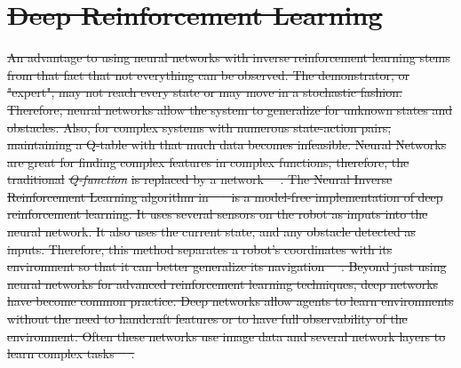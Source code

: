 \documentclass[12pt,american]{report}
\providecommand{\DIFdeltex}[1]{{\protect\color{red}\sout{#1}}}                      %
\providecommand{\DIFdelbegin}{} %
\providecommand{\DIFdel}[1]{\texorpdfstring{\DIFdeltex{#1}}{}} %
\newcommand{\DIFscaledelfig}{0.5}
\newlength{\DIFdelgraphicswidth} %
\newlength{\DIFdelgraphicsheight} %
\newcommand{\DIFdelincludegraphics}[2][]{%
\sbox{\DIFdelgraphicsbox}{\DIFOincludegraphics[#1]{#2}}%
\settoboxwidth{\DIFdelgraphicswidth}{\DIFdelgraphicsbox} %
\settoboxtotalheight{\DIFdelgraphicsheight}{\DIFdelgraphicsbox} %
\scalebox{\DIFscaledelfig}{%
\parbox[b]{\DIFdelgraphicswidth}{\usebox{\DIFdelgraphicsbox}\\[-\baselineskip] \rule{\DIFdelgraphicswidth}{0em}}\llap{\resizebox{\DIFdelgraphicswidth}{\DIFdelgraphicsheight}{%
\setlength{\unitlength}{\DIFdelgraphicswidth}%
\begin{picture}(1,1)%
\thicklines\linethickness{2pt} %
{\color[rgb]{1,0,0}\put(0,0){\framebox(1,1){}}}%
{\color[rgb]{1,0,0}\put(0,0){\line( 1,1){1}}}%
{\color[rgb]{1,0,0}\put(0,1){\line(1,-1){1}}}%
\end{picture}%
}\hspace*{3pt}}} %
} %
\DeclareRobustCommand{\DIFdelbegin}{\DIFOdelbegin \let\includegraphics\DIFdelincludegraphics} %
\begin{document}
\DIFdelbegin \section{\DIFdel{Deep Reinforcement Learning}}
\addtocounter{section}{-1}%
\DIFdel{An advantage to using neural networks with inverse reinforcement learning stems from that fact that not everything can be observed. The demonstrator, or "expert", may not reach every state or may move in a stochastic fashion. Therefore, neural networks allow the system to generalize for unknown states and obstacles. Also, for complex systems with numerous state-action pairs, maintaining a Q-table with that much data becomes infeasible. Neural Networks are great for finding complex features in complex functions, therefore, the traditional }\textit{\DIFdel{Q-function}} %
\DIFdel{is replaced by a network~\mbox{%
\cite{matiisen_2015}}%
. The Neural Inverse Reinforcement Learning algorithm in~\mbox{%
\cite{xia2016neural} }%
is a model-free implementation of deep reinforcement learning. It uses several sensors on the robot as inputs into the neural network.  It also uses the current state, and any obstacle detected as inputs. Therefore, this method separates a robot's coordinates with its environment so that it can better generalize its navigation~\mbox{%
\cite{xia2016neural}}%
. Beyond just using neural networks for advanced reinforcement learning techniques, deep networks have become common practice. Deep networks allow agents to learn environments without the need to handcraft features or to have full observability of the environment. Often these networks use image data and several network layers to learn complex tasks~\mbox{%
\cite{atari}}%
.
	}%
\end{document}
